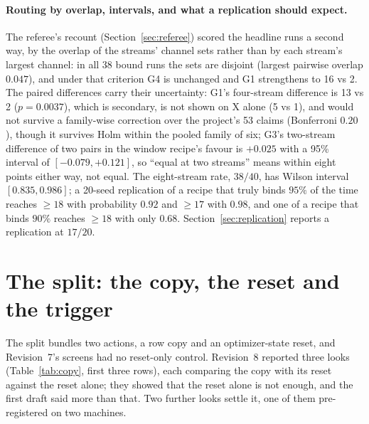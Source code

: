 \documentclass[11pt]{article}
\begin{document}
\paragraph{Routing by overlap, intervals, and what a replication should expect.} The referee's recount (Section~\ref{sec:referee}) scored the headline runs a second way, by the overlap of the streams' channel sets rather than by each stream's largest channel: in all 38 bound runs the sets are disjoint (largest pairwise overlap $0.047$), and under that criterion G4 is unchanged and G1 strengthens to 16 vs 2. The paired differences carry their uncertainty: G1's four-stream difference is 13 vs 2 ($p = 0.0037$), which is secondary, is not shown on X alone (5 vs 1), and would not survive a family-wise correction over the project's 53 claims (Bonferroni $0.20$), though it survives Holm within the pooled family of six; G3's two-stream difference of two pairs in the window recipe's favour is $+0.025$ with a 95\% interval of $[-0.079, +0.121]$, so ``equal at two streams'' means within eight points either way, not equal. The eight-stream rate, $38/40$, has Wilson interval $[0.835, 0.986]$; a 20-seed replication of a recipe that truly binds $95\%$ of the time reaches $\geq 18$ with probability $0.92$ and $\geq 17$ with $0.98$, and one of a recipe that binds $90\%$ reaches $\geq 18$ with only $0.68$. Section~\ref{sec:replication} reports a replication at $17/20$.

\section{The split: the copy, the reset and the trigger}
\label{sec:split}

The split bundles two actions, a row copy and an optimizer-state reset, and Revision~7's screens had no reset-only control. Revision~8 reported three looks (Table~\ref{tab:copy}, first three rows), each comparing the copy with its reset against the reset alone; they showed that the reset alone is not enough, and the first draft said more than that. Two further looks settle it, one of them pre-registered on two machines.
\end{document}

